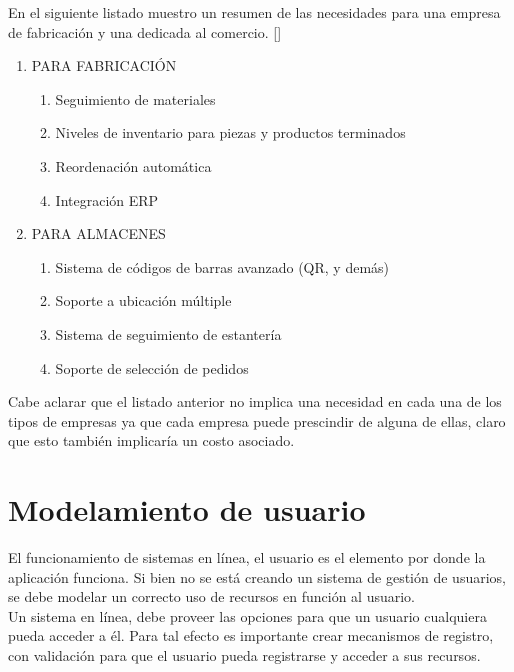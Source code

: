 En el siguiente listado muestro un resumen de las necesidades para una empresa de fabricación y una dedicada al comercio. [\citep{PCD:2019:Online}]

\begin{enumerate}
\item PARA FABRICACIÓN
\begin{enumerate}
\item Seguimiento de materiales
\item Niveles de inventario para piezas y productos terminados
\item Reordenación automática
\item Integración ERP
\end{enumerate}
\item PARA ALMACENES
\begin{enumerate}
\item Sistema de códigos de barras avanzado (QR, y demás)
\item Soporte a ubicación múltiple
\item Sistema de seguimiento de estantería
\item Soporte de selección de pedidos
\end{enumerate}
\end{enumerate}

Cabe aclarar que el listado anterior no implica una necesidad en cada una de los tipos de empresas ya que cada empresa puede prescindir de alguna de ellas, claro que esto también implicaría un costo asociado.

\section{Modelamiento de usuario}

El funcionamiento de sistemas en línea, el usuario es el elemento por donde la aplicación funciona. Si bien no se está creando un sistema de gestión de usuarios, se debe modelar un correcto uso de recursos en función al usuario.\\

Un sistema en línea, debe proveer las opciones para que un usuario cualquiera pueda acceder a él. Para tal efecto es importante crear mecanismos de registro, con validación para que el usuario pueda registrarse y acceder a sus recursos.\\

